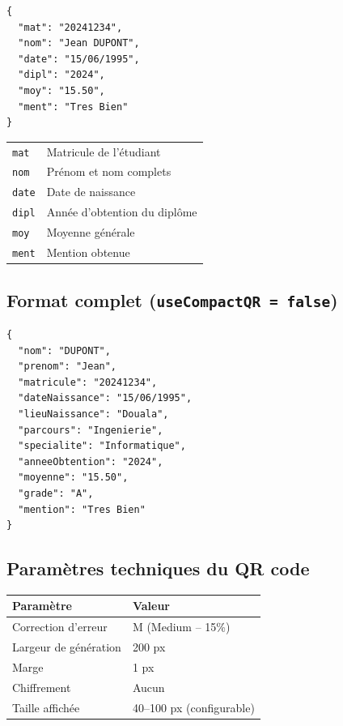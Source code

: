 \documentclass[a4paper,11pt]{article}
\begin{document}
\begin{tcolorbox}[colback=blue!5, colframe=sectionblue, title={\textbf{6 champs -- Toutes les donn\'ees visibles en clair}}]
\begin{lstlisting}
{
  "mat": "20241234",
  "nom": "Jean DUPONT",
  "date": "15/06/1995",
  "dipl": "2024",
  "moy": "15.50",
  "ment": "Tres Bien"
}
\end{lstlisting}

\begin{longtable}{p{3cm}p{9.5cm}}
\texttt{mat} & Matricule de l'\'etudiant \\
\texttt{nom} & Pr\'enom et nom complets \\
\texttt{date} & Date de naissance \\
\texttt{dipl} & Ann\'ee d'obtention du dipl\^ome \\
\texttt{moy} & Moyenne g\'en\'erale \\
\texttt{ment} & Mention obtenue \\
\end{longtable}
\end{tcolorbox}

\subsection{Format complet (\texttt{useCompactQR = false})}

\begin{tcolorbox}[colback=blue!5, colframe=sectionblue, title={\textbf{11 champs -- Toutes les donn\'ees visibles en clair}}]
\begin{lstlisting}
{
  "nom": "DUPONT",
  "prenom": "Jean",
  "matricule": "20241234",
  "dateNaissance": "15/06/1995",
  "lieuNaissance": "Douala",
  "parcours": "Ingenierie",
  "specialite": "Informatique",
  "anneeObtention": "2024",
  "moyenne": "15.50",
  "grade": "A",
  "mention": "Tres Bien"
}
\end{lstlisting}
\end{tcolorbox}

\subsection{Param\`etres techniques du QR code}

\begin{center}
\begin{tabular}{ll}
\toprule
\textbf{Param\`etre} & \textbf{Valeur} \\
\midrule
Correction d'erreur & M (Medium -- 15\%) \\
Largeur de g\'en\'eration & 200 px \\
Marge & 1 px \\
Chiffrement & Aucun \\
Taille affich\'ee & 40--100 px (configurable) \\
\bottomrule
\end{tabular}
\end{center}
\end{document}
